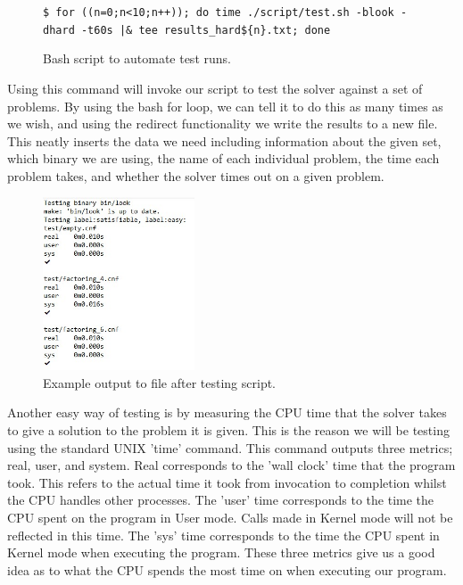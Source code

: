\documentclass{article}
\begin{document}
\begin{figure}[h]
    \centering
    \texttt{\$ for ((n=0;n<10;n++)); do time ./script/test.sh -blook -dhard -t60s |\& tee results\_hard\$\{n\}.txt; done}
    \caption{Bash script to automate test runs.}
\end{figure}

Using this command will invoke our script to test the solver against a set of problems. By using the bash for loop, we can tell
it to do this as many times as we wish, and using the redirect functionality we write the results to a new file. This neatly
inserts the data we need including information about the given set, which binary we are using, the name of each individual
problem, the time each problem takes, and whether the solver times out on a given problem. 

\begin{figure}[h]
    \centering
    \includegraphics[width=0.4\textwidth]{file_example.jpg}
    \caption{Example output to file after testing script.}
\end{figure}

Another easy way of testing is by measuring the CPU time that the solver takes to give a solution to the problem it is given. 
This is the reason we will be testing using the standard UNIX 'time' command. This command outputs three metrics; real, user, and 
system. Real corresponds to the 'wall clock' time that the program took. This refers to the actual time it took from invocation 
to completion whilst the CPU handles other processes. The 'user' time corresponds to the time the CPU spent on the program in 
User mode. Calls made in Kernel mode will not be reflected in this time. The 'sys' time corresponds to the time the CPU spent in 
Kernel mode when executing the program. These three metrics give us a good idea as to what the CPU spends the most time on when 
executing our program.
\end{document}
